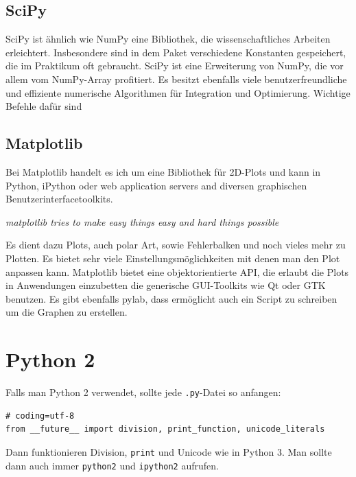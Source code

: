 \subsection{SciPy}
SciPy ist ähnlich wie NumPy eine Bibliothek, die wissenschaftliches Arbeiten erleichtert.
Insbesondere sind in dem Paket verschiedene Konstanten gespeichert, die im Praktikum oft gebraucht.
SciPy ist eine Erweiterung von NumPy, die vor allem vom NumPy-Array profitiert.
Es besitzt ebenfalls viele benutzerfreundliche und effiziente numerische Algorithmen für Integration und Optimierung.
Wichtige Befehle dafür sind
\subsection{Matplotlib}
Bei Matplotlib handelt es ich um eine Bibliothek für 2D-Plots und kann in Python, iPython oder web application servers and diversen graphischen Benutzerinterfacetoolkits.


\textit{matplotlib tries to make easy things easy and hard things possible}


Es dient dazu Plots, auch polar Art, sowie Fehlerbalken und noch vieles mehr zu Plotten.
Es bietet sehr viele Einstellungsmöglichkeiten mit denen man den Plot anpassen kann.
Matplotlib bietet eine objektorientierte API, die erlaubt die Plots in Anwendungen einzubetten die generische GUI-Toolkits wie Qt oder GTK benutzen.
Es gibt ebenfalls pylab, dass ermöglicht auch ein Script zu schreiben um die Graphen zu erstellen.
\section{Python 2}
Falls man Python 2 verwendet, sollte jede \texttt{.py}-Datei so anfangen:
\begin{verbatim}
# coding=utf-8
from __future__ import division, print_function, unicode_literals
\end{verbatim}
Dann funktionieren Division, \texttt{print} und Unicode wie in Python 3.
Man sollte dann auch immer \texttt{python2} und \texttt{ipython2} aufrufen.
